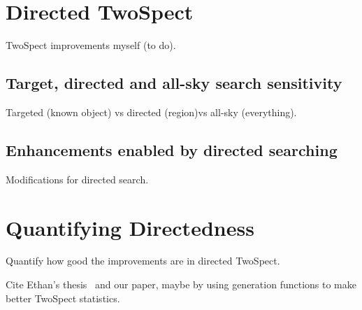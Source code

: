 


        

        \section{Directed TwoSpect}
        \label{directed}

            TwoSpect improvements myself (to do).

            \subsection{Target, directed and all-sky search sensitivity}
            \label{tradeoffs}

                Targeted (known object) vs directed (region)vs all-sky (everything).

            \subsection{Enhancements enabled by directed searching}
            \label{directed_enhancements}

                Modifications for directed search.

        \section{Quantifying Directedness}
        \label{quant_directed}
        
            Quantify how good the improvements are in directed TwoSpect. 

            Cite Ethan's thesis~\cite{RomeroThesis} and our paper, maybe by using generation functions to make better TwoSpect statistics.





